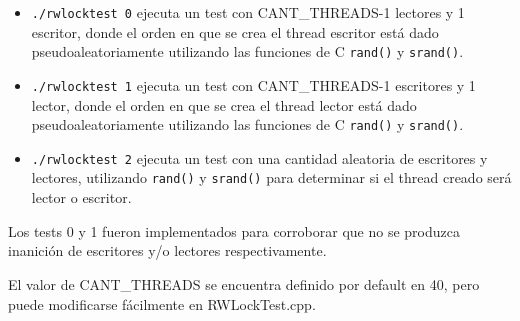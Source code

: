 \begin{itemize}

\item {\texttt{./rwlocktest 0} ejecuta un test con CANT\_THREADS-1 lectores y 1 escritor, donde el orden en que se crea el thread escritor está dado pseudoaleatoriamente utilizando las funciones de C \texttt{rand()} y \texttt{srand()}.}

\item {\texttt{./rwlocktest 1} ejecuta un test con CANT\_THREADS-1 escritores y 1 lector, donde el orden en que se crea el thread lector está dado pseudoaleatoriamente utilizando las funciones de C \texttt{rand()} y \texttt{srand()}.}

\item {\texttt{./rwlocktest 2} ejecuta un test con una cantidad aleatoria de escritores y lectores, utilizando \texttt{rand()} y \texttt{srand()} para determinar si el thread creado será lector o escritor.}

\end{itemize}

\par Los tests 0 y 1 fueron implementados para corroborar que no se produzca inanición de escritores y/o lectores respectivamente. 
\par El valor de CANT\_THREADS se encuentra definido por default en 40, pero puede modificarse fácilmente en RWLockTest.cpp.


